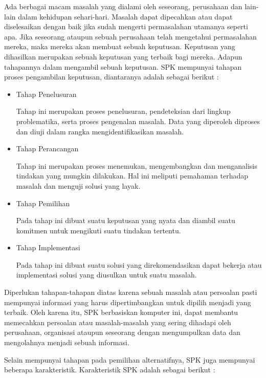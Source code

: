	Ada berbagai macam masalah yang dialami oleh seseorang, perusahaan dan lain-lain dalam kehidupan sehari-hari. Masalah dapat dipecahkan atau dapat diselesaikan dengan baik jika sudah mengerti permasalahan utamanya seperti apa. Jika seseorang ataupun sebuah perusahaan telah mengetahui permasalahan mereka, maka mereka akan membuat sebuah keputusan. Keputusan yang dihasilkan merupakan sebuah keputusan yang terbaik bagi mereka. Adapun tahapannya dalam mengambil sebuah keputusan. SPK mempunyai tahapan proses pengambilan keputusan, diantaranya adalah sebagai berikut \cite{karakteristikspk}:
	\begin{itemize}
		\item Tahap Penelusuran
			
			Tahap ini merupakan proses penelusuran, pendeteksian dari lingkup problematika, serta proses pengenalan masalah. Data yang diperoleh diproses dan diuji dalam rangka mengidentifikasikan masalah.
		\item Tahap Perancangan
		
	Tahap ini merupakan proses menemukan, mengembangkan dan menganalisis tindakan yang mungkin dilakukan. Hal ini meliputi pemahaman terhadap masalah dan menguji solusi yang layak.
		\item Tahap Pemilihan
		
		Pada tahap ini dibuat suatu keputusan yang nyata dan diambil suatu komitmen untuk mengikuti suatu tindakan tertentu.
		\item Tahap Implementasi
		
		Pada tahap ini dibuat suatu solusi yang direkomendasikan dapat bekerja atau implementasi solusi yang diusulkan untuk suatu masalah.
		
	\end{itemize}
	
		Diperlukan tahapan-tahapan diatas karena sebuah masalah atau persoalan pasti mempunyai informasi yang harus dipertimbangkan untuk dipilih menjadi yang terbaik. Oleh karena itu, SPK berbasiskan komputer ini, dapat membantu memecahkan persoalan atau masalah-masalah yang sering dihadapi oleh perusahaan, organisasi ataupun seseorang dengan mengumpulkan data dan mengolahnya menjadi sebuah informasi.
		
		Selain mempunyai tahapan pada pemilihan alternatifnya, SPK juga mempunyai beberapa karakteristik. Karakteristik SPK adalah sebagai berikut \cite{karakteristikspk}:
		
